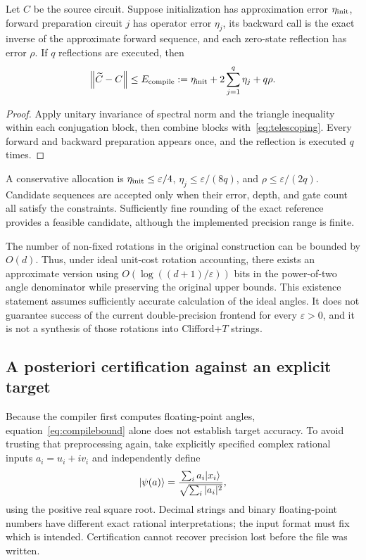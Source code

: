 \begin{proposition}\label{prop:compileerror}
Let $C$ be the source circuit. Suppose initialization has approximation error $\eta_{\rm init}$, forward preparation circuit $j$ has operator error $\eta_j$, its backward call is the exact inverse of the approximate forward sequence, and each zero-state reflection has error $\rho$. If $q$ reflections are executed, then
\begin{equation}\label{eq:compilebound}
\left\lVert \widetilde C-C\right\rVert\le
E_{\rm compile}:=\eta_{\rm init}+2\sum_{j=1}^q\eta_j+q\rho.
\end{equation}
\end{proposition}
\begin{proof}
Apply unitary invariance of spectral norm and the triangle inequality within each conjugation block, then combine blocks with~\eqref{eq:telescoping}. Every forward and backward preparation appears once, and the reflection is executed $q$ times.
\end{proof}
A conservative allocation is $\eta_{\rm init}\le\varepsilon/4$, $\eta_j\le\varepsilon/(8q)$, and $\rho\le\varepsilon/(2q)$. Candidate sequences are accepted only when their error, depth, and gate count all satisfy the constraints. Sufficiently fine rounding of the exact reference provides a feasible candidate, although the implemented precision range is finite.

The number of non-fixed rotations in the original construction can be bounded by $O(d)$. Thus, under ideal unit-cost rotation accounting, there exists an approximate version using $O(\log((d+1)/\varepsilon))$ bits in the power-of-two angle denominator while preserving the original upper bounds. This existence statement assumes sufficiently accurate calculation of the ideal angles. It does not guarantee success of the current double-precision frontend for every $\varepsilon>0$, and it is not a synthesis of those rotations into Clifford+$T$ strings\cite{ross2014}.

\subsection{A posteriori certification against an explicit target}
Because the compiler first computes floating-point angles, equation~\eqref{eq:compilebound} alone does not establish target accuracy. To avoid trusting that preprocessing again, take explicitly specified complex rational inputs $a_i=u_i+iv_i$ and independently define
\begin{equation}\label{eq:rationaltarget}
\lvert \psi(a)\rangle=\frac{\sum_i a_i\lvert x_i\rangle}{\sqrt{\sum_i|a_i|^2}},
\end{equation}
using the positive real square root. Decimal strings and binary floating-point numbers have different exact rational interpretations; the input format must fix which is intended. Certification cannot recover precision lost before the file was written.

